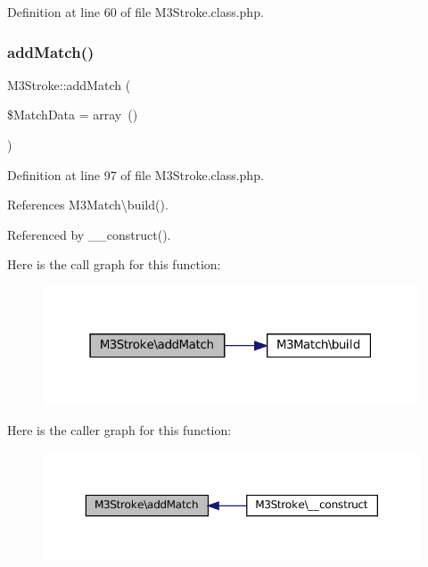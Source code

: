 Definition at line 60 of file M3\+Stroke.\+class.\+php.

\mbox{\label{class_m3_stroke_a09dcfb9dfcbd8dc99b3acd0fe3b378b7}} 
\subsubsection{\texorpdfstring{add\+Match()}{addMatch()}}
{\footnotesize\ttfamily M3\+Stroke\+::add\+Match (\begin{DoxyParamCaption}\item[{}]{\$\+Match\+Data = {\ttfamily array~()} }\end{DoxyParamCaption})\hspace{0.3cm}{\ttfamily [protected]}}



Definition at line 97 of file M3\+Stroke.\+class.\+php.



References M3\+Match\textbackslash{}build().



Referenced by \+\_\+\+\_\+construct().

Here is the call graph for this function\+:\nopagebreak
\begin{figure}[H]
\begin{center}
\leavevmode
\includegraphics[width=316pt]{class_m3_stroke_a09dcfb9dfcbd8dc99b3acd0fe3b378b7_cgraph}
\end{center}
\end{figure}
Here is the caller graph for this function\+:\nopagebreak
\begin{figure}[H]
\begin{center}
\leavevmode
\includegraphics[width=350pt]{class_m3_stroke_a09dcfb9dfcbd8dc99b3acd0fe3b378b7_icgraph}
\end{center}
\end{figure}
\mbox{\label{class_m3_stroke_a0a5e6074f1d4319f4af7cddca3565362}} 
